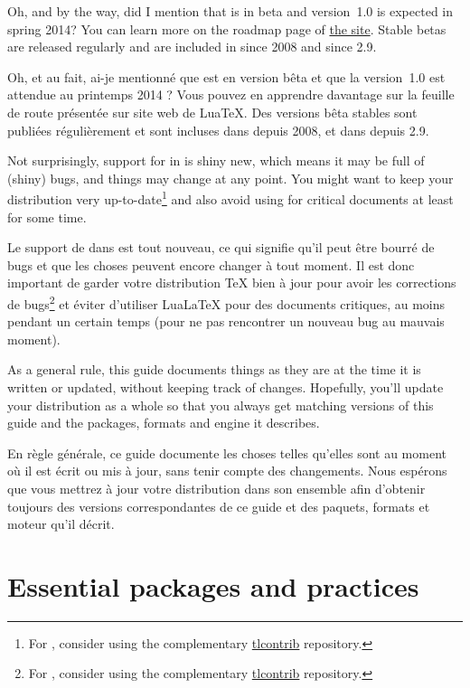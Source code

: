 \documentclass{lltxdoc}
\begin{document}
\medskip

Oh, and by the way, did I mention that \luatex is in beta and version~1.0 is
expected in spring 2014? You can learn more on the roadmap page of
\href{http://luatex.org/}{the \luatex site}. Stable betas are released
regularly and are included in \texlive since 2008 and \miktex since 2.9.

Oh, et au fait, ai-je mentionné que \luatex est en version bêta et que la version~1.0 est attendue au printemps 2014 ? Vous pouvez en apprendre davantage sur la feuille de route présentée sur site web de LuaTeX. Des versions bêta stables sont publiées régulièrement et sont incluses dans \texlive depuis 2008, et dans \miktex depuis 2.9.

Not surprisingly, support for \luatex in \latex is shiny new, which means it
may be full of (shiny) bugs, and things may change at any point. You might
want to keep your \tex distribution very up-to-date\footnote{For \texlive,
  consider using the complementary
  \href{http://tlcontrib.metatex.org/} {tlcontrib} repository.} and also avoid
using \lualatex for critical documents at least for some time.

Le support de \luatex dans \latex est tout nouveau, ce qui signifie qu'il peut être bourré de bugs et que les choses peuvent encore changer à tout moment. Il est donc important de garder votre distribution TeX bien à jour pour avoir les corrections de bugs\footnote{For \texlive, consider using the complementary \href{http://tlcontrib.metatex.org/}{tlcontrib} repository.} et éviter d'utiliser LuaLaTeX pour des documents critiques, au moins pendant un certain temps (pour ne pas rencontrer un nouveau bug au mauvais moment).

As a general rule, this guide documents things as they are at the time it is
written or updated, without keeping track of changes. Hopefully, you'll update
your distribution as a whole so that you always get matching versions of this
guide and the packages, formats and engine it describes.

En règle générale, ce guide documente les choses telles qu'elles sont au moment où il est écrit ou mis à jour, sans tenir compte des changements. Nous espérons que vous mettrez à jour votre distribution dans son ensemble afin d'obtenir toujours des versions correspondantes de ce guide et des paquets, formats et moteur qu'il décrit.


\section{Essential packages and practices}\label{essential}
\end{document}
